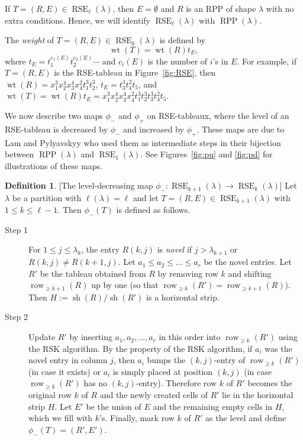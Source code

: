 \documentclass{amsart}
\numberwithin{equation}{section}
\theoremstyle{definition}
\newtheorem{defn}[thm]{Definition}
\newcommand\sh{\operatorname{sh}}
\newcommand\row{\operatorname{row}}
\newcommand\pd{\phi_+}
\newcommand\pu{\phi_-}
\newcommand\RSE{\operatorname{RSE}}
\newcommand\RPP{\operatorname{RPP}}
\newcommand\wt{\operatorname{wt}}
\begin{document}
If $T=(R,E)\in \RSE_\ell(\lambda)$, then
$E=\emptyset$ and $R$ is an RPP of shape $\lambda$ with no extra conditions.
Hence, we will identify $\RSE_\ell(\lambda)$ with $\RPP(\lambda)$.

The \emph{weight} of $T=(R,E)\in\RSE_{k}(\lambda)$ is defined by
\[
\wt(T) = \wt(R)t_E,
\]
where $t_E=t_1^{c_1(E)}t_2^{c_2(E)}\cdots$ and $c_i(E)$ is the number of $i$'s
in $E$. For example, if $T=(R,E)$ is the RSE-tableau in Figure~\ref{fig:RSE},
then $\wt(R)=x_1^{3}x_2^4x_3^4x_4^2t_1^3t_2^3$, $t_E=t_3^3t_4^2t_5$, and
$\wt(T)=\wt(R)t_E=x_1^{3}x_2^4x_3^4x_4^2t_1^3t_2^3t_3^3t_4^2t_5$.

We now describe two maps $\pu$ and $\pd$ on RSE-tableaux, where the level of an
RSE-tableau is decreased by $\pu$ and increased by $\pd$. These maps are due to
Lam and Pylyavskyy \cite{LP2007} who used them as intermediate steps in their
bijection between $\RPP(\lambda)$ and $\RSE_1(\lambda)$. See
Figures~\ref{fig:pu} and \ref{fig:pd} for illustrations of these maps.

\begin{defn}\label{def:pu}
[The level-decreasing map $\pu:\RSE_{k+1}(\lambda)\to
  \RSE_{k}(\lambda)$] 
  Let $\lambda$ be a partition with $\ell(\lambda)=\ell$ and let $T=(R,E)\in
  \RSE_{k+1}(\lambda)$ with $1\le k\le \ell-1$. Then $\pu(T)$ is defined as
  follows.
\begin{description}
\item[Step 1] For $1\le j\le \lambda_{k}$, the entry $R(k,j)$ is \emph{novel} if
  $j>\lambda_{k+1}$ or $R(k,j)\ne R(k+1,j)$. Let $a_1\le a_2\le \dots\le a_r$ be
  the novel entries. Let $R'$ be the tableau obtained from $R$ by removing row
  $k$ and shifting $\row_{\ge k+1}(R)$ up by one (so that $\row_{\ge
    k}(R')=\row_{\ge k+1}(R)$). Then $H:=\sh(R)/\sh(R')$ is a horizontal strip.
\item[Step 2] Update $R'$ by inserting $a_1,a_2,\dots,a_r$ in this order into
  $\row_{\ge k}(R')$ using the RSK algorithm. By the property of the RSK
  algorithm, if $a_i$ was the novel entry in column $j$, then $a_i$ bumps the
  $(k,j)$-entry of $\row_{\ge k}(R')$ (in case it exists) or $a_i$ is simply
  placed at position $(k,j)$ (in case $\row_{\ge k}(R')$ has no $(k,j)$-entry).
  Therefore row $k$ of $R'$ becomes the original row $k$ of $R$
  and the newly created cells of $R'$ lie in the horizontal strip $H$. Let $E'$
  be the union of $E$ and the remaining empty cells in $H$, which we fill with
  $k$'s. Finally, mark row $k$ of $R'$ as the level and define $\pu(T)=(R',E')$.
\end{description}
\end{defn}
\end{document}
